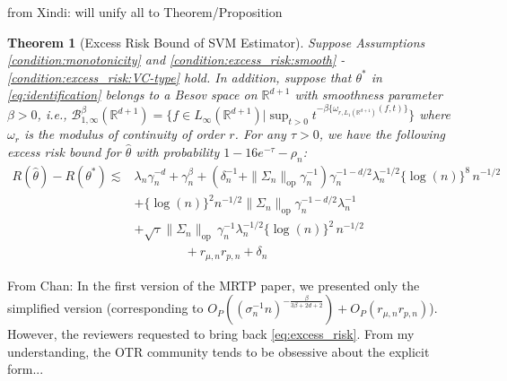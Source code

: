 \documentclass[12pt]{article}
\newtheorem{theorem}{Theorem}%
\newcommand{\R}{\mathbb{R}}
\newcommand{\CP}[1]{{\color{purple}From Chan: #1}}
\newcommand{\XL}[1]{{\color{blue}from Xindi: #1}}
\begin{document}
 \XL{will unify all to Theorem/Proposition}
 \begin{theorem}[Excess Risk Bound of SVM Estimator] \label{thm:excess_risk}
     Suppose Assumptions \ref{condition:monotonicity} and \ref{condition:excess_risk:smooth} - \ref{condition:excess_risk:VC-type} hold. In addition, suppose that $\theta^*$ in \eqref{eq:identification} belongs to a Besov space on $\R^{d+1}$ with smoothness parameter $\beta>0$, i.e., $\mathcal{B}_{1,\infty}^\beta(\R^{d+1}) = \{f\in L_\infty(\R^{d+1})|\sup_{t>0}t^{-\beta\{\omega_{r,L_1(\R^{d+1})}(f,t)\}}\}$ where $\omega_r$ is the modulus of continuity of order $r$. For any $\tau>0$, we have the following excess risk bound for $\widehat\theta$ with probability $1-16e^{-\tau}-\rho_n$:
    \begin{align}
       R(\widehat\theta)-R\left(\theta^*\right) \lesssim & \lambda_n\gamma_n^{-d} + \gamma_n^{\beta} + \left(\delta_n^{-1}+\|\Sigma_n\|_{\mathrm{op}}\gamma_n^{-1}\right)\gamma_n^{-1-d/2}\lambda_n^{-1/2}\{\log(n)\}^{8}\,n^{-1/2}\nonumber\\
& + \{\log(n)\}^2 n^{-1/2}\|\Sigma_n\|_{\mathrm{op}}\gamma_n^{-1-d/2}\lambda_n^{-1}\nonumber\\
& + \sqrt{\tau} \|\Sigma_n\|_{\mathrm{op}}\,\gamma_n^{-1}\lambda_n^{-1/2}\{\log(n)\}^2\,n^{-1/2}\nonumber\\
       & \qquad\qquad + r_{\mu,n}r_{p,n} + {\delta_n}\label{eq:excess_risk}
    \end{align}
\end{theorem}
\CP{In the first version of the MRTP paper, we presented only the simplified version (corresponding to $O_P\left((\sigma_n^{-1}n)^{-\frac{\beta}{3\beta + 2d + 2}}\right)+O_P(r_{\mu,n}r_{p,n} )$). However, the reviewers requested to bring back \eqref{eq:excess_risk}. From my understanding, the OTR community tends to be obsessive about the explicit form...}
\end{document}
